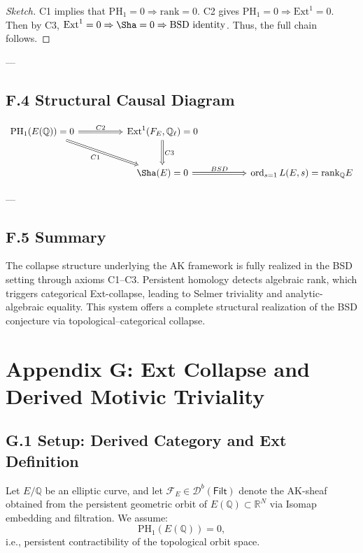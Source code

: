 \begin{proof}[Sketch]
C1 implies that \( \mathrm{PH}_1 = 0 \Rightarrow \mathrm{rank} = 0 \).  
C2 gives \( \mathrm{PH}_1 = 0 \Rightarrow \mathrm{Ext}^1 = 0 \).  
Then by C3, \( \mathrm{Ext}^1 = 0 \Rightarrow \Sha = 0 \Rightarrow \text{BSD identity} \).  
Thus, the full chain follows.
\end{proof}

---

\subsection*{F.4 Structural Causal Diagram}

\[
\begin{tikzcd}[row sep=large, column sep=huge]
\mathrm{PH}_1(E(\mathbb{Q})) = 0 \arrow[r, Rightarrow, "C2"] \arrow[dr, Rightarrow, swap, "C1"] &
\mathrm{Ext}^1(F_E, \mathbb{Q}_\ell) = 0 \arrow[d, Rightarrow, "C3"] \\
& \Sha(E) = 0 \arrow[r, Rightarrow, "BSD"] & \operatorname{ord}_{s=1}L(E,s) = \mathrm{rank}_{\mathbb{Q}}E
\end{tikzcd}
\]

---

\subsection*{F.5 Summary}

The collapse structure underlying the AK framework is fully realized in the BSD setting through axioms C1–C3.  
Persistent homology detects algebraic rank, which triggers categorical Ext-collapse,  
leading to Selmer triviality and analytic-algebraic equality.  
This system offers a complete structural realization of the BSD conjecture via topological–categorical collapse.



\section*{Appendix G: Ext Collapse and Derived Motivic Triviality}

\subsection*{G.1 Setup: Derived Category and Ext Definition}

Let \( E/\mathbb{Q} \) be an elliptic curve, and let \( \mathcal{F}_E \in \mathcal{D}^b(\mathsf{Filt}) \) denote the AK-sheaf obtained from the persistent geometric orbit of \( E(\mathbb{Q}) \subset \mathbb{R}^N \) via Isomap embedding and filtration.  
We assume:
\[
\mathrm{PH}_1(E(\mathbb{Q})) = 0,
\]
i.e., persistent contractibility of the topological orbit space.

